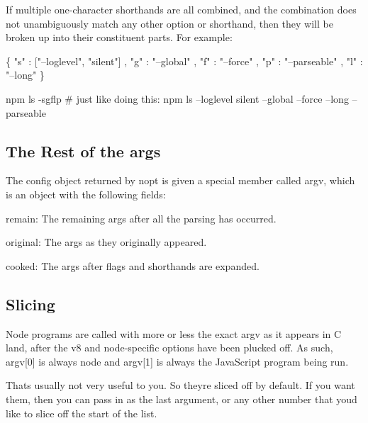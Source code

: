 If multiple one-\/character shorthands are all combined, and the combination does not unambiguously match any other option or shorthand, then they will be broken up into their constituent parts. For example\+:


\begin{DoxyCode}
\{ "s" : ["--loglevel", "silent"]
, "g" : "--global"
, "f" : "--force"
, "p" : "--parseable"
, "l" : "--long"
\}
\end{DoxyCode}



\begin{DoxyCode}
npm ls -sgflp
# just like doing this:
npm ls --loglevel silent --global --force --long --parseable
\end{DoxyCode}


\subsection*{The Rest of the args}

The config object returned by nopt is given a special member called {\ttfamily argv}, which is an object with the following fields\+:


\begin{DoxyItemize}
\item {\ttfamily remain}\+: The remaining args after all the parsing has occurred.
\item {\ttfamily original}\+: The args as they originally appeared.
\item {\ttfamily cooked}\+: The args after flags and shorthands are expanded.
\end{DoxyItemize}

\subsection*{Slicing}

Node programs are called with more or less the exact argv as it appears in C land, after the v8 and node-\/specific options have been plucked off. As such, {\ttfamily argv\mbox{[}0\mbox{]}} is always {\ttfamily node} and {\ttfamily argv\mbox{[}1\mbox{]}} is always the Java\+Script program being run.

That\textquotesingle{}s usually not very useful to you. So they\textquotesingle{}re sliced off by default. If you want them, then you can pass in {} as the last argument, or any other number that you\textquotesingle{}d like to slice off the start of the list. 